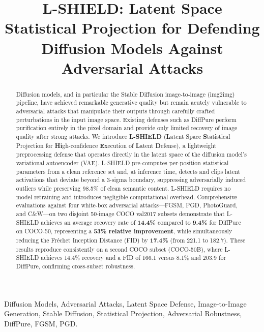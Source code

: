 \documentclass[conference]{IEEEtran}
\begin{document}
\title{L-SHIELD: Latent Space Statistical Projection for Defending
Diffusion Models Against Adversarial Attacks}

\author{
}

\maketitle

\begin{abstract}
Diffusion models, and in particular the Stable Diffusion image-to-image
(img2img) pipeline, have achieved remarkable generative quality but remain
acutely vulnerable to adversarial attacks that manipulate their outputs through
carefully crafted perturbations in the input image space. Existing defenses
such as DiffPure perform purification entirely in the pixel domain and provide
only limited recovery of image quality after strong attacks. We introduce
\textbf{L-SHIELD} (\textbf{L}atent Space \textbf{S}tatistical Projection for
\textbf{Hi}gh-confidence \textbf{E}xecution of \textbf{L}atent \textbf{D}efense),
a lightweight preprocessing defense that operates directly in the latent
space of the diffusion model's variational autoencoder (VAE). L-SHIELD
pre-computes per-position statistical parameters from a clean reference set
and, at inference time, detects and clips latent activations that deviate
beyond a 3-sigma boundary, suppressing adversarially induced outliers while
preserving 98.5\% of clean semantic content. L-SHIELD requires no model
retraining and introduces negligible computational overhead. Comprehensive
evaluations against four white-box adversarial attacks---FGSM, PGD,
PhotoGuard, and C\&W---on two disjoint 50-image COCO val2017 subsets
demonstrate that L-SHIELD achieves an average recovery rate of \textbf{14.4\%}
compared to \textbf{9.4\%} for DiffPure on COCO-50, representing a
\textbf{53\% relative improvement}, while simultaneously reducing the
Fr\'{e}chet Inception Distance (FID) by \textbf{17.4\%} (from 221.1 to
182.7). These results reproduce consistently on a second COCO subset
(COCO-50B), where L-SHIELD achieves 14.4\% recovery and a FID of 166.1
versus 8.1\% and 203.9 for DiffPure, confirming cross-subset robustness.
\end{abstract}

\begin{IEEEkeywords}
Diffusion Models, Adversarial Attacks, Latent Space Defense, Image-to-Image
Generation, Stable Diffusion, Statistical Projection, Adversarial Robustness,
DiffPure, FGSM, PGD.
\end{IEEEkeywords}
\end{document}
